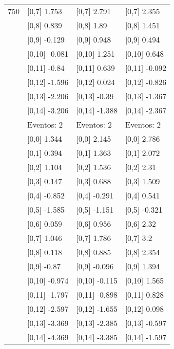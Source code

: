 \begin{table}
\begin{tabular}[t]{llll}
750 & {}[0,7] 1.753 & {}[0,7] 2.791 & {}[0,7] 2.355\\
\addlinespace
 & {}[0,8] 0.839 & {}[0,8] 1.89 & {}[0,8] 1.451\\
 & {}[0,9] -0.129 & {}[0,9] 0.948 & {}[0,9] 0.494\\
 & {}[0,10] -0.081 & {}[0,10] 1.251 & {}[0,10] 0.648\\
 & {}[0,11] -0.84 & {}[0,11] 0.639 & {}[0,11] -0.092\\
 & {}[0,12] -1.596 & {}[0,12] 0.024 & {}[0,12] -0.826\\
\addlinespace
 & {}[0,13] -2.206 & {}[0,13] -0.39 & {}[0,13] -1.367\\
 & {}[0,14] -3.206 & {}[0,14] -1.388 & {}[0,14] -2.367\\
 & Eventos:  2 & Eventos:  2 & Eventos:  2\\
 & {}[0,0] 1.344 & {}[0,0] 2.145 & {}[0,0] 2.786\\
 & {}[0,1] 0.394 & {}[0,1] 1.363 & {}[0,1] 2.072\\
\addlinespace
 & {}[0,2] 1.104 & {}[0,2] 1.536 & {}[0,2] 2.31\\
 & {}[0,3] 0.147 & {}[0,3] 0.688 & {}[0,3] 1.509\\
 & {}[0,4] -0.852 & {}[0,4] -0.291 & {}[0,4] 0.541\\
 & {}[0,5] -1.585 & {}[0,5] -1.151 & {}[0,5] -0.321\\
 & {}[0,6] 0.059 & {}[0,6] 0.956 & {}[0,6] 2.32\\
\addlinespace
1000 & {}[0,7] 1.046 & {}[0,7] 1.786 & {}[0,7] 3.2\\
 & {}[0,8] 0.118 & {}[0,8] 0.885 & {}[0,8] 2.354\\
 & {}[0,9] -0.87 & {}[0,9] -0.096 & {}[0,9] 1.394\\
 & {}[0,10] -0.974 & {}[0,10] -0.115 & {}[0,10] 1.565\\
 & {}[0,11] -1.797 & {}[0,11] -0.898 & {}[0,11] 0.828\\
\addlinespace
 & {}[0,12] -2.597 & {}[0,12] -1.655 & {}[0,12] 0.098\\
 & {}[0,13] -3.369 & {}[0,13] -2.385 & {}[0,13] -0.597\\
 & {}[0,14] -4.369 & {}[0,14] -3.385 & {}[0,14] -1.597\\
\bottomrule
\end{tabular}
\end{table}
